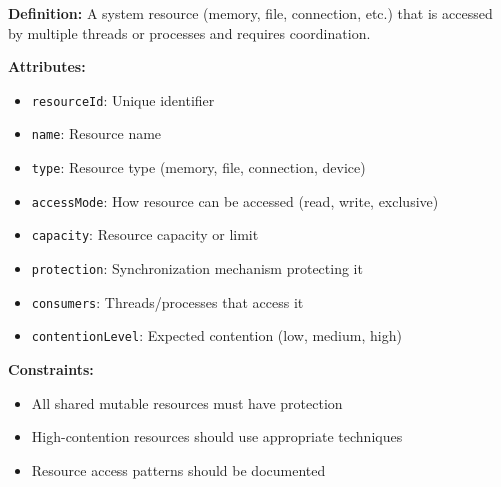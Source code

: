 \documentclass[11pt,letterpaper]{article}
\begin{document}
\begin{definitionbox}
\textbf{Definition:} A system resource (memory, file, connection, etc.) that is accessed by multiple threads or processes and requires coordination.

\textbf{Attributes:}
\begin{itemize}[nosep]
    \item \texttt{resourceId}: Unique identifier
    \item \texttt{name}: Resource name
    \item \texttt{type}: Resource type (memory, file, connection, device)
    \item \texttt{accessMode}: How resource can be accessed (read, write, exclusive)
    \item \texttt{capacity}: Resource capacity or limit
    \item \texttt{protection}: Synchronization mechanism protecting it
    \item \texttt{consumers}: Threads/processes that access it
    \item \texttt{contentionLevel}: Expected contention (low, medium, high)
\end{itemize}

\textbf{Constraints:}
\begin{itemize}[nosep]
    \item All shared mutable resources must have protection
    \item High-contention resources should use appropriate techniques
    \item Resource access patterns should be documented
\end{itemize}
\end{definitionbox}
\end{document}
